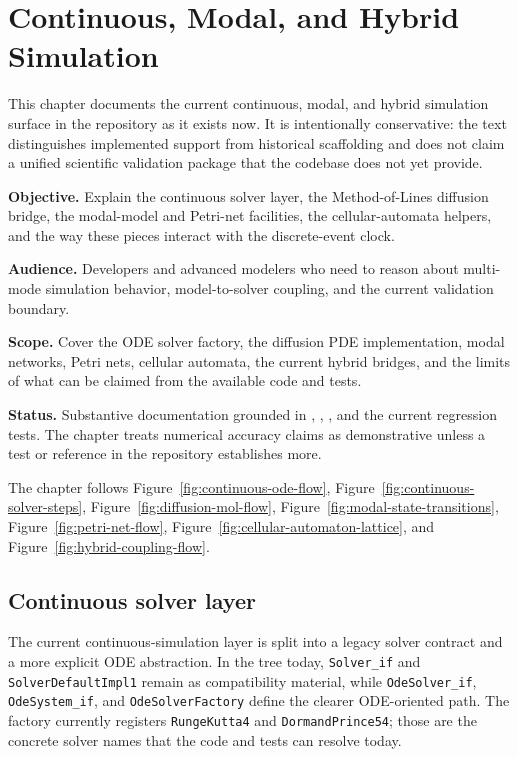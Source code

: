 \chapter{Continuous, Modal, and Hybrid Simulation}
\label{chap:continuous-modal-and-hybrid-simulation}

This chapter documents the current continuous, modal, and hybrid simulation
surface in the repository as it exists now. It is intentionally conservative:
the text distinguishes implemented support from historical scaffolding and does
not claim a unified scientific validation package that the codebase does not
yet provide.

\noindent\textbf{Objective.} Explain the continuous solver layer, the
Method-of-Lines diffusion bridge, the modal-model and Petri-net facilities,
the cellular-automata helpers, and the way these pieces interact with the
discrete-event clock.

\noindent\textbf{Audience.} Developers and advanced modelers who need to reason
about multi-mode simulation behavior, model-to-solver coupling, and the current
validation boundary.

\noindent\textbf{Scope.} Cover the ODE solver factory, the diffusion PDE
implementation, modal networks, Petri nets, cellular automata, the current
hybrid bridges, and the limits of what can be claimed from the available code
and tests.

\noindent\textbf{Status.} Substantive documentation grounded in
, ,
, and the current regression tests. The
chapter treats numerical accuracy claims as demonstrative unless a test or
reference in the repository establishes more.

The chapter follows Figure~\ref{fig:continuous-ode-flow},
Figure~\ref{fig:continuous-solver-steps},
Figure~\ref{fig:diffusion-mol-flow},
Figure~\ref{fig:modal-state-transitions},
Figure~\ref{fig:petri-net-flow},
Figure~\ref{fig:cellular-automaton-lattice}, and
Figure~\ref{fig:hybrid-coupling-flow}.

\section{Continuous solver layer}
\label{sec:continuous-solver-layer}

The current continuous-simulation layer is split into a legacy solver contract
and a more explicit ODE abstraction. In the tree today, \texttt{Solver\_if} and
\texttt{SolverDefaultImpl1} remain as compatibility material, while
\texttt{OdeSolver\_if}, \texttt{OdeSystem\_if}, and
\texttt{OdeSolverFactory} define the clearer ODE-oriented path. The factory
currently registers \texttt{RungeKutta4} and \texttt{DormandPrince54}; those
are the concrete solver names that the code and tests can resolve today.

